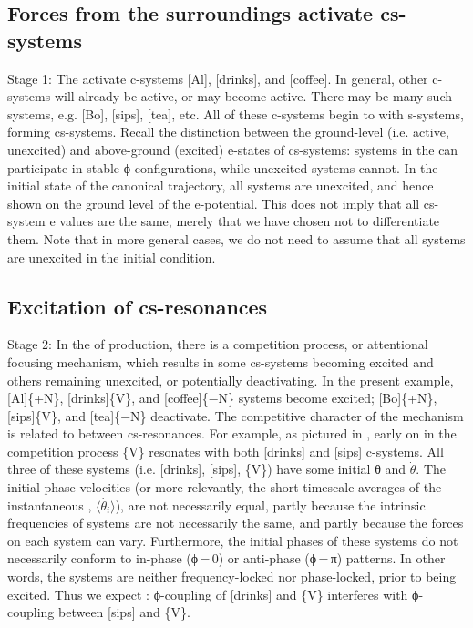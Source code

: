 \subsection{Forces from the surroundings activate cs-systems} 
Stage 1: The  activate c-systems [Al], [drinks], and [coffee]. In general, other c-systems will already be active, or may become active. There may be many such systems, e.g. [Bo], [sips], [tea], etc. All of these c-systems begin to  with s-systems, forming cs-systems. Recall the distinction between the ground-level (i.e. active, unexcited) and above-ground (excited) e-states of cs-systems: systems in the  can participate in stable ϕ-configurations, while unexcited systems cannot. In the initial state of the canonical trajectory, all systems are unexcited, and hence shown on the ground level of the e-potential. This does not imply that all cs-system e values are the same, merely that we have chosen not to differentiate them. Note that in more general cases, we do not need to assume that all systems are unexcited in the initial condition.

\subsection{Excitation of cs-resonances}
Stage 2: In the  of production, there is a competition process, or attentional focusing mechanism, which results in some cs-systems becoming excited and others remaining unexcited, or potentially deactivating. In the present example, [Al]\{+N\}, [drinks]\{V\}, and [coffee]\{−N\} systems become excited; [Bo]\linebreak\relax\{+N\}, [sips]\{V\}, and [tea]\{−N\} deactivate. The competitive character of the mechanism is related to  between cs-resonances. For example, as pictured in {}, early on in the competition process \{V\} resonates with both [drinks] and [sips] c-systems. All three of these systems (i.e. [drinks], [sips], \{V\}) have some initial θ and $\dot{\theta} $. The initial phase velocities (or more relevantly, the short-timescale averages of the instantaneous , $\langle\dot{\theta_i}\rangle$), are not necessarily equal, partly because the intrinsic frequencies of systems are not necessarily the same, and partly because the  forces on each system can vary. Furthermore, the initial phases of these systems do not necessarily conform to in-phase (ϕ\,=\,0) or anti-phase (ϕ\,=\,π) patterns. In other words, the systems are neither frequency-locked nor phase-locked, prior to being excited. Thus we expect : ϕ{}-coupling of [drinks] and \{V\} interferes with ϕ{}-coupling between [sips] and \{V\}.

